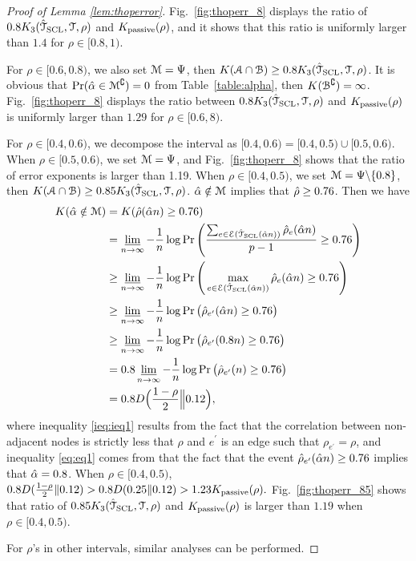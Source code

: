 \begin{proof}[Proof of Lemma \ref{lem:thoperror}]
	Fig.~\ref{fig:thoperr_8} displays the ratio of $0.8K _{3}(\hat{\mathcal{T}}_{{\rm SCL}},\mathcal{T},\rho)$ and $K _{{\rm passive}}(\rho)$, and it shows that this ratio is uniformly larger than $1.4$ for $\rho\in[0.8,1)$.

	For $\rho\in[0.6,0.8)$, we also set $\mathcal{M}=\Psi$, then $K ( \mathcal{A}\cap \mathcal{B})\geq 0.8K _{3}(\hat{\mathcal{T}}_{{\rm SCL}},\mathcal{T},\rho)$. It is obvious that $\Pr(\hat{\alpha}\in \mathcal{M}^{\complement})=0$ from Table~\ref{table:alpha}, 
	then $K (\mathcal{B}^{\complement})=\infty$. Fig.~\ref{fig:thoperr_8} displays the ratio between $0.8K _{3}(\hat{\mathcal{T}}_{{\rm SCL}},\mathcal{T},\rho)$ and $K _{{\rm passive}}(\rho)$ is  uniformly larger than $1.29$ for $\rho\in[0.6,8)$.
	
	For $\rho\in[0.4,0.6)$, we decompose the interval as $[0.4,0.6)=[0.4,0.5)\cup [0.5,0.6)$. When $\rho\in[0.5,0.6)$, we set $\mathcal{M}=\Psi$, and Fig.~\ref{fig:thoperr_8} 
	shows that the ratio of error exponents is larger than 1.19. When $\rho\in[0.4,0.5)$, we set $\mathcal{M}=\Psi\backslash\{0.8\}$, then $K ( \mathcal{A}\cap \mathcal{B})\geq 0.85K _{3}(\hat{\mathcal{T}}_{{\rm SCL}},\mathcal{T},\rho)$. $\hat{\alpha}\notin \mathcal{M}$ implies that $\hat{\rho} \geq 0.76$. Then we have
	\begin{align}
		K (\hat{\alpha}\notin \mathcal{M})&=K (\hat{\rho}(\hat{\alpha} n)\geq 0.76)\\*
		&=\varliminf_{n\rightarrow \infty}-\frac{1}{n}\log\Pr\Bigg(\frac{\sum_{e\in\mathcal{E} (\hat{\mathcal{T}}_{{\rm SCL}}(\hat{\alpha} n) )}\hat{\rho}_{e}(\hat{\alpha} n)}{p-1}\geq 0.76\Bigg)\\
		&\geq\varliminf_{n\rightarrow \infty}-\frac{1}{n}\log\Pr\Bigg(\max_{e\in\mathcal{E} (\hat{\mathcal{T}}_{{\rm SCL}}(\hat{\alpha} n) )}\hat{\rho}_{e}(\hat{\alpha} n)\geq 0.76\Bigg)\\
		&\geq \varliminf_{n\rightarrow \infty}-\frac{1}{n}\log\Pr\big(\hat{\rho}_{e^{\prime}}(\hat{\alpha} n)\geq 0.76\big) \label{ieq:ieq1}\\
		&\geq \varliminf_{n\rightarrow \infty}-\frac{1}{n}\log\Pr\big(\hat{\rho}_{e^{\prime}}(0.8n)\geq 0.76\big) \label{eq:eq1}\\
		&= 0.8\varliminf_{n\rightarrow \infty}-\frac{1}{n}\log\Pr\big(\hat{\rho}_{e^{\prime}}(n)\geq 0.76\big)\\
		&= 0.8D\Big(\frac{1-\rho}{2}\Big\|0.12\Big),
	\end{align}
	where inequality \eqref{ieq:ieq1} results from the fact that the correlation between non-adjacent nodes is strictly less that $\rho$ and $e^{\prime}$ is an edge such that $\rho_{e^{\prime}}=\rho$, and inequality \eqref{eq:eq1} comes from that the fact that the event $\hat{\rho}_{e^{\prime}}(\hat{\alpha} n)\geq 0.76$ implies that $\hat{\alpha}=0.8$. When $\rho\in[0.4,0.5)$, $0.8D(\frac{1-\rho}{2}\|0.12)>0.8D(0.25\|0.12)>1.23K _{{\rm passive}}(\rho).$
	Fig.~\ref{fig:thoperr_85} shows that ratio of $0.85K _{3}(\hat{\mathcal{T}}_{{\rm SCL}},\mathcal{T},\rho)$ and $K _{{\rm passive}}(\rho)$ is larger than $1.19$ when $\rho\in[0.4,0.5)$.

	For $\rho$'s in other intervals, similar analyses can be performed.
\end{proof}


